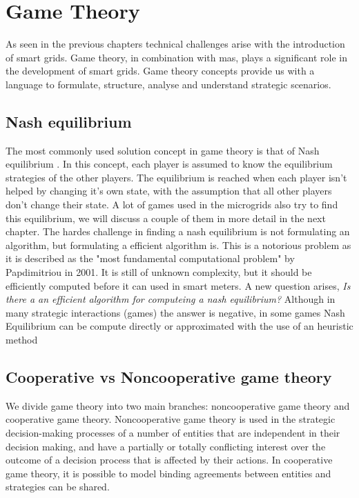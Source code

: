 \section{Game Theory}
As seen in the previous chapters technical challenges arise with the introduction of smart grids. Game theory, in combination with \gls{mas}, plays a significant role in the development of smart grids. Game theory concepts provide us with a language to formulate, structure, analyse and understand strategic scenarios.

\subsection{Nash equilibrium}
The most commonly used solution concept in game theory is that of Nash equilibrium \cite{CourseInGameTheory}. In this concept, each player is assumed to know the equilibrium strategies of the other players. The equilibrium is reached when each player isn't helped by changing it's own state, with the assumption that all other players don't change their state. A lot of games used in the microgrids also try to find this equilibrium, we will discuss a couple of them in more detail in the next chapter.
 The hardes challenge in finding a nash equilibrium is not formulating an algorithm, but formulating a efficient algorithm is. This is a notorious problem as it is described as the "most fundamental computational problem" by Papdimitriou in 2001. It is still of unknown complexity, but it should be efficiently computed before it can used in smart meters. A new question arises, \emph{Is there a an efficient algorithm for computeing a nash equilibrium?} Although in many strategic interactions (games) the answer is negative, in some games Nash Equilibrium can be compute directly or approximated with the use of an heuristic method\cite{MicrogridModellingPetrosAristidou}\cite{AumannGameTheoryAccomplish}


\subsection{Cooperative vs Noncooperative game theory} 
We divide game theory into two main branches: noncooperative game theory and cooperative game theory. Noncooperative game theory is used in the strategic decision-making processes of a number of entities that are independent in their decision making, and have a partially or totally conflicting interest over the outcome of a decision process that is affected by their actions\cite{keypaper}. In cooperative game theory, it is possible to model binding agreements between entities and strategies can be shared. 

